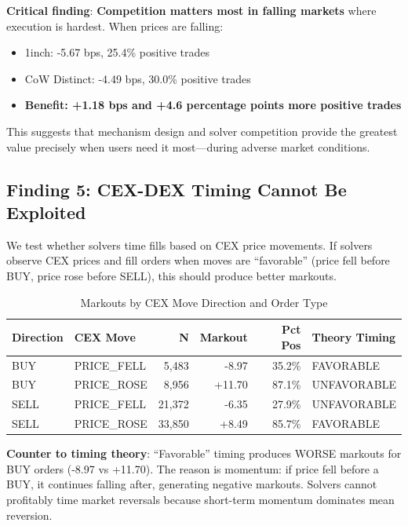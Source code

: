 \documentclass[12pt,a4paper]{article}
\begin{document}
\textbf{Critical finding}: \textbf{Competition matters most in falling markets} where execution is hardest. When prices are falling:
\begin{itemize}
    \item 1inch: -5.67 bps, 25.4\% positive trades
    \item CoW Distinct: -4.49 bps, 30.0\% positive trades
    \item \textbf{Benefit: +1.18 bps and +4.6 percentage points more positive trades}
\end{itemize}

This suggests that mechanism design and solver competition provide the greatest value precisely when users need it most---during adverse market conditions.

\subsection{Finding 5: CEX-DEX Timing Cannot Be Exploited}

We test whether solvers time fills based on CEX price movements. If solvers observe CEX prices and fill orders when moves are ``favorable'' (price fell before BUY, price rose before SELL), this should produce better markouts.

\begin{table}[H]
\centering
\caption{Markouts by CEX Move Direction and Order Type}
\label{tab:timing}
\begin{tabular}{llrrrl}
\toprule
\textbf{Direction} & \textbf{CEX Move} & \textbf{N} & \textbf{Markout} & \textbf{Pct Pos} & \textbf{Theory Timing} \\
\midrule
BUY & PRICE\_FELL & 5,483 & -8.97 & 35.2\% & FAVORABLE \\
BUY & PRICE\_ROSE & 8,956 & +11.70 & 87.1\% & UNFAVORABLE \\
SELL & PRICE\_FELL & 21,372 & -6.35 & 27.9\% & UNFAVORABLE \\
SELL & PRICE\_ROSE & 33,850 & +8.49 & 85.7\% & FAVORABLE \\
\bottomrule
\end{tabular}
\end{table}

\textbf{Counter to timing theory}: ``Favorable'' timing produces WORSE markouts for BUY orders (-8.97 vs +11.70). The reason is momentum: if price fell before a BUY, it continues falling after, generating negative markouts. Solvers cannot profitably time market reversals because short-term momentum dominates mean reversion.
\end{document}
